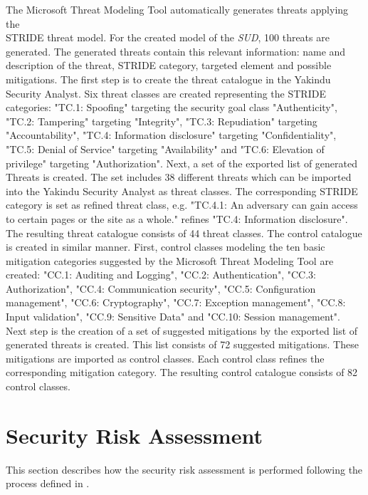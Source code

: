 The Microsoft Threat Modeling Tool automatically generates threats applying the \\STRIDE threat model. For the created model of the \textit{SUD}, 100 threats are generated. The generated threats contain this relevant information: name and description of the threat, STRIDE category, targeted element and possible mitigations.
\newline
The first step is to create the threat catalogue in the Yakindu Security Analyst. Six threat classes are created representing the STRIDE categories: "TC.1: Spoofing" targeting the security goal class "Authenticity", "TC.2: Tampering" targeting "Integrity", "TC.3: Repudiation" targeting "Accountability", "TC.4: Information disclosure" targeting "Confidentiality", "TC.5: Denial of Service" targeting "Availability" and "TC.6: Elevation of privilege" targeting "Authorization".
Next, a set of the exported list of generated Threats is created. The set includes 38 different threats which can be imported into the Yakindu Security Analyst as threat classes. The corresponding STRIDE category is set as refined threat class, e.g. "TC.4.1: An adversary can gain access to certain pages or the site as a whole." refines "TC.4: Information disclosure". The resulting threat catalogue consists of 44 threat classes.
\newline
The control catalogue is created in similar manner. First, control classes modeling the ten basic mitigation categories suggested by the Microsoft Threat Modeling Tool\cite{mtmtmitigations} are created: "CC.1: Auditing and Logging", "CC.2: Authentication", "CC.3: Authorization", "CC.4: Communication security", "CC.5: Configuration management", "CC.6: Cryptography", "CC.7: Exception management", "CC.8: Input validation", "CC.9: Sensitive Data" and "CC.10: Session management".
\\
Next step is the creation of a set of suggested mitigations by the exported list of generated threats is created. This list consists of 72 suggested mitigations. These mitigations are imported as control classes. Each control class refines the corresponding mitigation category. The resulting control catalogue consists of 82 control classes.

\section{Security Risk Assessment}
\label{riskassessment}
This section describes how the security risk assessment is performed following the process defined in \textit{}.


